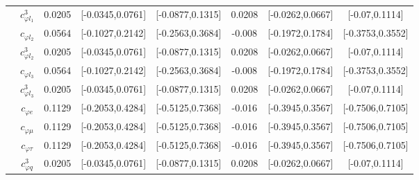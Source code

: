 \documentclass{article}
\begin{document}
\begin{table}[H]
\begin{tabular}{|c|c|c|c|c|c|c|c|}
 & $c_{\varphi l_1}^{3}$ & 0.0205                             & [-0.0345,0.0761]                                 & [-0.0877,0.1315] & 0.0208                             & [-0.0262,0.0667]                                 & [-0.07,0.1114] \\ \cline{2-8}
 & $c_{\varphi l_2}$ & 0.0564                             & [-0.1027,0.2142]                                 & [-0.2563,0.3684] & -0.008                             & [-0.1972,0.1784]                                 & [-0.3753,0.3552] \\ \cline{2-8}
 & $c_{\varphi l_2}^{3}$ & 0.0205                             & [-0.0345,0.0761]                                 & [-0.0877,0.1315] & 0.0208                             & [-0.0262,0.0667]                                 & [-0.07,0.1114] \\ \cline{2-8}
 & $c_{\varphi l_3}$ & 0.0564                             & [-0.1027,0.2142]                                 & [-0.2563,0.3684] & -0.008                             & [-0.1972,0.1784]                                 & [-0.3753,0.3552] \\ \cline{2-8}
 & $c_{\varphi l_3}^{3}$ & 0.0205                             & [-0.0345,0.0761]                                 & [-0.0877,0.1315] & 0.0208                             & [-0.0262,0.0667]                                 & [-0.07,0.1114] \\ \cline{2-8}
 & $c_{\varphi e}$ & 0.1129                             & [-0.2053,0.4284]                                 & [-0.5125,0.7368] & -0.016                             & [-0.3945,0.3567]                                 & [-0.7506,0.7105] \\ \cline{2-8}
 & $c_{\varphi \mu}$ & 0.1129                             & [-0.2053,0.4284]                                 & [-0.5125,0.7368] & -0.016                             & [-0.3945,0.3567]                                 & [-0.7506,0.7105] \\ \cline{2-8}
 & $c_{\varphi \tau}$ & 0.1129                             & [-0.2053,0.4284]                                 & [-0.5125,0.7368] & -0.016                             & [-0.3945,0.3567]                                 & [-0.7506,0.7105] \\ \cline{2-8}
 & $c_{\varphi q}^{3}$ & 0.0205                             & [-0.0345,0.0761]                                 & [-0.0877,0.1315] & 0.0208                             & [-0.0262,0.0667]                                 & [-0.07,0.1114] \\ \cline{2-8}

\end{tabular}
\end{table}
\end{document}

